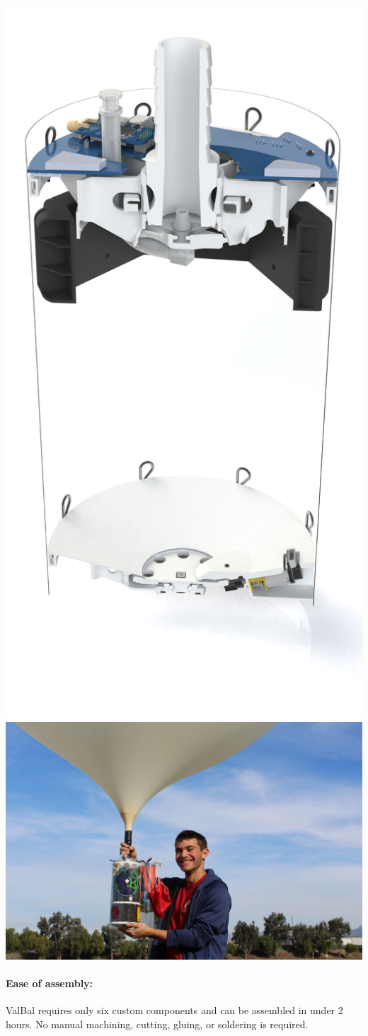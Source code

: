 \documentclass[12pt, twocolumn]{article}
\begin{document}
{\begin{minipage}{\linewidth}
\vspace*{\fill}
\begin{center}\includegraphics[width=0.5\linewidth,trim={0cm 13cm 0cm 5cm},clip]{render.jpg}\includegraphics[width=0.5\linewidth,trim={12cm 2cm 25cm 12cm},clip]{vbpic.jpg}\end{center}
\paragraph{\sffamily Ease of assembly:} ValBal requires only six custom components and can be assembled in under 2 hours. No manual machining, cutting, gluing, or soldering is required.


\end{minipage}}
\end{document}
